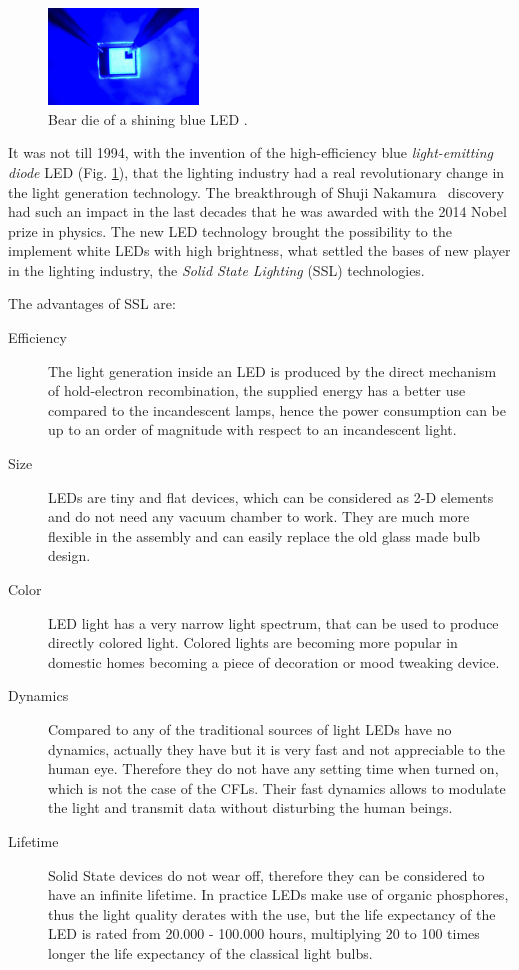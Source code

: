 \begin{figure}[!h]
\centering
\includegraphics[width=4cm]{./0_intro/img/10-7-14-nobel-prize-blue-led.jpg}
\caption{Bear die of a shining  blue LED  .}
\label{fig:blue_LED}
\end{figure}

It was not till 1994, with the invention of the high-efficiency blue \emph{light-emitting diode} LED (Fig. \ref{fig:blue_LED}), that the lighting industry had a real revolutionary change in the light generation technology. The breakthrough of Shuji Nakamura~\cite{94Nakamura} discovery had such an impact in the last decades that he was awarded with the 2014 Nobel prize in physics. The new LED technology brought the possibility to the implement white LEDs with high brightness, what settled the bases of new player in the lighting industry, the \emph{Solid State Lighting} (SSL) technologies.


The advantages of SSL are:
\begin{description}
  \item [Efficiency] The light generation inside an LED is produced by the direct mechanism of hold-electron recombination, the supplied energy has a better use compared to the incandescent lamps, hence the power consumption can be up to an order of magnitude with respect to an incandescent light.

  \item [Size] LEDs are tiny and flat devices, which can be considered as 2-D elements and do not need any vacuum chamber to work. They are much more flexible in the assembly and can easily replace the old glass made bulb design.

  \item [Color] LED light has a very narrow light spectrum, that can be used to produce directly colored light. Colored lights are becoming more popular in domestic homes becoming a piece of decoration or mood tweaking device.

  \item [Dynamics] Compared to any of the traditional sources of light LEDs have no dynamics, actually they have but it is very fast and not appreciable to the human eye. Therefore they do not have any setting time when turned on, which is not the case of the  CFLs. Their fast dynamics allows to modulate the light and transmit data without disturbing the human beings.

  \item [Lifetime] Solid State devices do not wear off, therefore they can be considered to have an infinite lifetime. In practice LEDs make use of organic phosphores, thus the light quality derates with the use, but the life expectancy of the LED is rated from 20.000 - 100.000 hours, multiplying 20 to 100 times longer the life expectancy of the classical light bulbs.
\end{description}

